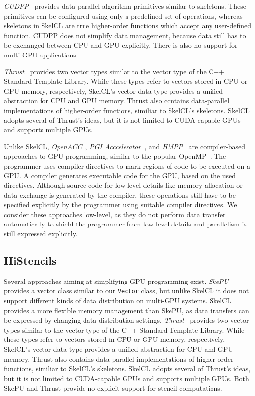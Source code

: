 \emph{CUDPP}~\cite{SeHZO-07} provides data-parallel algorithm primitives similar to skeletons.
These primitives can be configured using only a predefined set of operations, whereas
skeletons in SkelCL are true higher-order functions which accept any user-defined function.
CUDPP does not simplify data management, because data still has to be exchanged between CPU and GPU explicitly.
There is also no support for multi-GPU applications.

\emph{Thrust}~\cite{HoB-09a} provides two vector types similar to the vector type of the C++ Standard Template Library.
While these types refer to vectors stored in CPU or GPU memory, respectively, SkelCL's vector data type provides a unified abstraction for CPU and GPU memory.
Thrust also contains data-parallel implementations of higher-order functions, similiar to SkelCL's skeletons.
SkelCL adopts several of Thrust's ideas, but it is not limited to CUDA-capable GPUs and supports multiple GPUs.

Unlike SkelCL, \emph{OpenACC}~\cite{OpenACC}, \emph{PGI Acccelerator}~\cite{PGI-10}, and \emph{HMPP}~\cite{HMPP-09} are compiler-based approaches to GPU programming, similar to the popular OpenMP~\cite{OpenMP-08}.
The programmer uses compiler directives to mark regions of code to be executed on a GPU.
A compiler generates executable code for the GPU, based on the used directives.
Although source code for low-level details like memory allocation or data exchange is generated by the compiler, these operations still have to be specified explicitly by the programmer using suitable compiler directives.
We consider these approaches low-level, as they do not perform data transfer automatically to shield the programmer from low-level details and parallelism is still expressed explicitly.

\subsection{HiStencils}
Several approaches aiming at simplifying GPU programming exist.
\emph{SkePU}~\cite{EnK-10} provides a vector class similar to our \texttt{Vector} class, but unlike SkelCL it does not support different kinds of data distribution on multi-GPU systems.
SkelCL provides a more flexible memory management than SkePU, as data transfers can be expressed by changing data distribution settings.
\emph{Thrust}~\cite{HoB-09a} provides two vector types similar to the vector type of the C++ Standard Template Library.
While these types refer to vectors stored in CPU or GPU memory, respectively, SkelCL's vector data type provides a unified abstraction for CPU and GPU memory.
Thrust also contains data-parallel implementations of higher-order functions, similiar to SkelCL's skeletons.
SkelCL adopts several of Thrust's ideas, but it is not limited to CUDA-capable GPUs and supports multiple GPUs.
Both SkePU and Thrust provide no explicit support for stencil computations.


